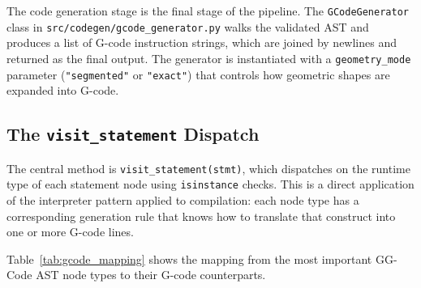 The code generation stage is the final stage of the pipeline. The \texttt{GCodeGenerator} class in \texttt{src/codegen/gcode\_generator.py} walks the validated AST and produces a list of G-code instruction strings, which are joined by newlines and returned as the final output. The generator is instantiated with a \texttt{geometry\_mode} parameter (\texttt{"segmented"} or \texttt{"exact"}) that controls how geometric shapes are expanded into G-code.

\subsection*{The \texttt{visit\_statement} Dispatch}

The central method is \texttt{visit\_statement(stmt)}, which dispatches on the runtime type of each statement node using \texttt{isinstance} checks. This is a direct application of the interpreter pattern applied to compilation: each node type has a corresponding generation rule that knows how to translate that construct into one or more G-code lines.

Table~\ref{tab:gcode_mapping} shows the mapping from the most important GG-Code AST node types to their G-code counterparts.

